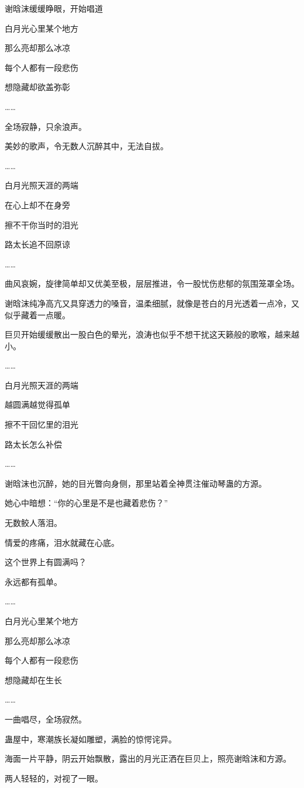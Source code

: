 \begin{this_body}
谢晗沫缓缓睁眼，开始唱道

白月光心里某个地方

那么亮却那么冰凉

每个人都有一段悲伤

想隐藏却欲盖弥彰

……

全场寂静，只余浪声。

美妙的歌声，令无数人沉醉其中，无法自拔。

……

白月光照天涯的两端

在心上却不在身旁

擦不干你当时的泪光

路太长追不回原谅

……

曲风哀婉，旋律简单却又优美至极，层层推进，令一股忧伤悲郁的氛围笼罩全场。

谢晗沫纯净高亢又具穿透力的嗓音，温柔细腻，就像是苍白的月光透着一点冷，又似乎藏着一点暖。

巨贝开始缓缓散出一股白色的晕光，浪涛也似乎不想干扰这天籁般的歌喉，越来越小。

……

白月光照天涯的两端

越圆满越觉得孤单

擦不干回忆里的泪光

路太长怎么补偿

……

谢晗沫也沉醉，她的目光瞥向身侧，那里站着全神贯注催动琴蛊的方源。

她心中暗想：“你的心里是不是也藏着悲伤？”

无数鲛人落泪。

情爱的疼痛，泪水就藏在心底。

这个世界上有圆满吗？

永远都有孤单。

……

白月光心里某个地方

那么亮却那么冰凉

每个人都有一段悲伤

想隐藏却在生长

……

一曲唱尽，全场寂然。

蛊屋中，寒潮族长凝如雕塑，满脸的惊愕诧异。

海面一片平静，阴云开始飘散，露出的月光正洒在巨贝上，照亮谢晗沫和方源。

两人轻轻的，对视了一眼。

\end{this_body}

